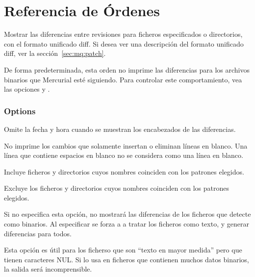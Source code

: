 \chapter{Referencia de Órdenes}
\label{cmdref}



Mostrar las diferencias entre revisiones para ficheros especificados o
directorios, con el formato unificado diff.  Si desea ver una
descripción del formato unificado diff, ver la sección~\ref{sec:mq:patch}.

De forma predeterminada, esta orden no imprime las diferencias para
los archivos binarios que Mercurial esté siguiendo.  Para controlar
este comportamiento, vea las opciones  y
.

\subsection{Options}


Omite la fecha y hora cuando se muestran los encabezados de las
diferencias.


No imprime los cambios que solamente insertan o eliminan líneas en
blanco.  Una línea que contiene espacios en blanco no se considera
como una línea en blanco.


Incluye ficheros y directorios cuyos nombres coinciden con los
patrones elegidos.


Excluye los ficheros y directorios cuyos nombres coinciden con los
patrones elegidos.


Si no especifica esta opción,  no mostrará las diferencias
de los ficheros que detecte como binarios.  Al especificar 
se forza a  a tratar los ficheros como texto, y generar
diferencias para todos.

Esta opción es útil para los ficherso que son ``texto en mayor
medida'' pero que tienen caracteres NUL.  Si lo usa en ficheros que
contienen muchos datos binarios, la salida será incomprensible.

